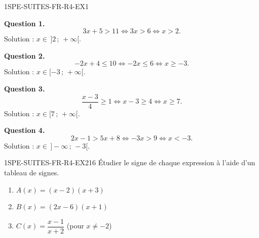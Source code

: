 \begin{corrige}{1SPE-SUITES-FR-R4-EX1}


\textbf{Question 1.}
\[
3x + 5 > 11 \iff 3x > 6 \iff x > 2.
\]
Solution : $x \in \,]2\,;\,+\infty[$.


\textbf{Question 2.}
\[
-2x + 4 \leq 10 \iff -2x \leq 6 \iff x \geq -3.
\]
Solution : $x \in [-3\,;\,+\infty[$.

\textbf{Question 3.}
\[
\frac{x-3}{4} \geq 1 \iff x - 3 \geq 4 \iff x \geq 7.
\]
Solution : $x \in [7\,;\,+\infty[$.


\textbf{Question 4.}
\[
2x - 1 > 5x + 8 \iff -3x > 9 \iff x < -3.
\]
Solution : $x \in \,]-\infty\,;\,-3[$.

\end{corrige}


\begin{exercice}{1SPE-SUITES-FR-R4-EX2}{1}{6}
Étudier le signe de chaque expression à l'aide d'un tableau de signes.
\begin{enumerate}
  \item $A(x) = (x - 2)(x + 3)$
  \item $B(x) = (2x - 6)(x + 1)$
  \item $C(x) = \dfrac{x - 1}{x + 2}$ (pour $x \neq -2$)
\end{enumerate}
\end{exercice}


